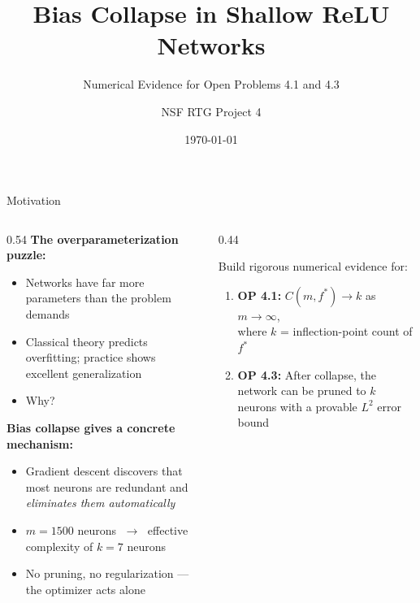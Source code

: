 \documentclass[aspectratio=169, 10pt]{beamer}
\title[Bias Collapse in ReLU Networks]{%
  Bias Collapse in Shallow ReLU Networks}
\subtitle{Numerical Evidence for Open Problems 4.1 and 4.3}
\author[NSF RTG Project 4]{NSF RTG Project 4}
\institute{Auburn University}
\date{\today}
\newcommand{\fstar}{f^\ast}
\begin{document}
\begin{frame}[plain]
  \titlepage
\end{frame}

\begin{frame}{Motivation}
  \begin{columns}[T]
    \begin{column}{0.54\textwidth}
      \textbf{The overparameterization puzzle:}
      \begin{itemize}
        \item Networks have far more parameters than the problem demands
        \item Classical theory predicts overfitting;
              practice shows excellent generalization
        \item \alert{Why?}
      \end{itemize}
      \vspace{0.6em}
      \textbf{Bias collapse gives a concrete mechanism:}
      \begin{itemize}
        \item Gradient descent discovers that most neurons are
              redundant and \emph{eliminates them automatically}
        \item $m = 1500$ neurons $\;\longrightarrow\;$
              effective complexity of $k = 7$ neurons
        \item No pruning, no regularization — the optimizer acts alone
      \end{itemize}
    \end{column}
    \begin{column}{0.44\textwidth}
      \begin{tcolorbox}[slideboxA, title={This project}]
        \small
        Build rigorous numerical evidence for:
        \vspace{4pt}
        \begin{enumerate}
          \item \textbf{OP 4.1:} $C(m,\fstar) \to k$ as $m\to\infty$,\\
                where $k$ = inflection-point count of $\fstar$
          \vspace{4pt}
          \item \textbf{OP 4.3:} After collapse, the network
                can be pruned to $k$ neurons with a
                provable $L^2$ error bound
        \end{enumerate}
      \end{tcolorbox}
    \end{column}
  \end{columns}
\end{frame}
\end{document}
